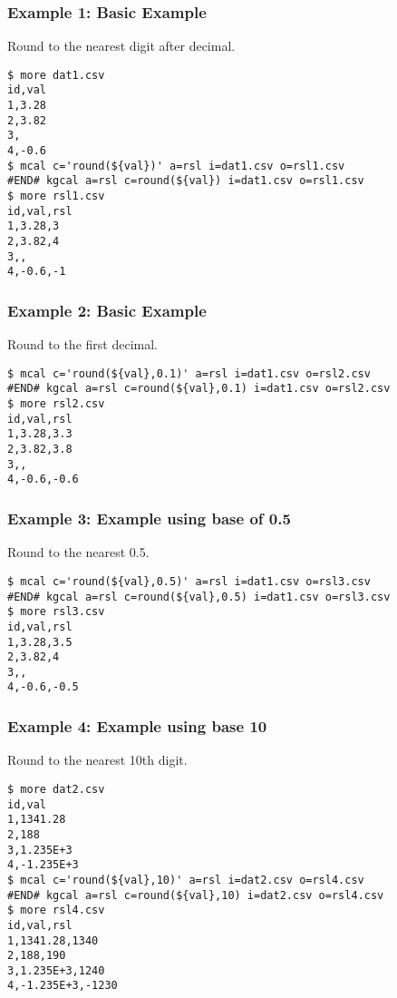 \subsubsection*{Example 1: Basic Example}

Round to the nearest digit after decimal.


\begin{Verbatim}[baselinestretch=0.7,frame=single]
$ more dat1.csv
id,val
1,3.28
2,3.82
3,
4,-0.6
$ mcal c='round(${val})' a=rsl i=dat1.csv o=rsl1.csv
#END# kgcal a=rsl c=round(${val}) i=dat1.csv o=rsl1.csv
$ more rsl1.csv
id,val,rsl
1,3.28,3
2,3.82,4
3,,
4,-0.6,-1
\end{Verbatim}
\subsubsection*{Example 2: Basic Example}

Round to the first decimal.


\begin{Verbatim}[baselinestretch=0.7,frame=single]
$ mcal c='round(${val},0.1)' a=rsl i=dat1.csv o=rsl2.csv
#END# kgcal a=rsl c=round(${val},0.1) i=dat1.csv o=rsl2.csv
$ more rsl2.csv
id,val,rsl
1,3.28,3.3
2,3.82,3.8
3,,
4,-0.6,-0.6
\end{Verbatim}
\subsubsection*{Example 3: Example using base of 0.5}

Round to the nearest 0.5.


\begin{Verbatim}[baselinestretch=0.7,frame=single]
$ mcal c='round(${val},0.5)' a=rsl i=dat1.csv o=rsl3.csv
#END# kgcal a=rsl c=round(${val},0.5) i=dat1.csv o=rsl3.csv
$ more rsl3.csv
id,val,rsl
1,3.28,3.5
2,3.82,4
3,,
4,-0.6,-0.5
\end{Verbatim}
\subsubsection*{Example 4: Example using base 10}

Round to the nearest 10th digit.


\begin{Verbatim}[baselinestretch=0.7,frame=single]
$ more dat2.csv
id,val
1,1341.28
2,188
3,1.235E+3
4,-1.235E+3
$ mcal c='round(${val},10)' a=rsl i=dat2.csv o=rsl4.csv
#END# kgcal a=rsl c=round(${val},10) i=dat2.csv o=rsl4.csv
$ more rsl4.csv
id,val,rsl
1,1341.28,1340
2,188,190
3,1.235E+3,1240
4,-1.235E+3,-1230
\end{Verbatim}
